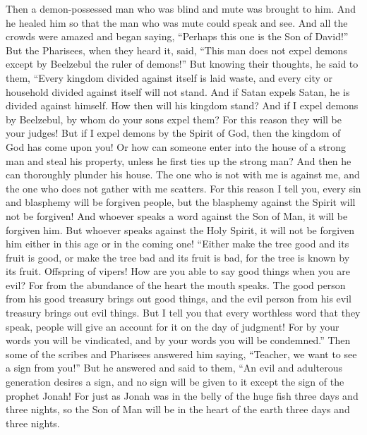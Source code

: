 \begin{biblechapter}
 Then a demon-possessed man who was blind and mute was brought to him. And he healed him so that the man who was mute could speak and see.
\verse And all the crowds were amazed and began saying, “Perhaps this one is the Son of David!”
\verse But the Pharisees, when they heard it, said, “This man does not expel demons except by Beelzebul the ruler of demons!”
\verse But knowing their thoughts, he said to them, “Every kingdom divided against itself is laid waste, and every city or household divided against itself will not stand.
\verse And if Satan expels Satan, he is divided against himself. How then will his kingdom stand?
\verse And if I expel demons by Beelzebul, by whom do your sons expel them? For this reason they will be your judges!
\verse But if I expel demons by the Spirit of God, then the kingdom of God has come upon you!
\verse Or how can someone enter into the house of a strong man and steal his property, unless he first ties up the strong man? And then he can thoroughly plunder his house.
\verse The one who is not with me is against me, and the one who does not gather with me scatters.
\verse For this reason I tell you, every sin and blasphemy will be forgiven people, but the blasphemy against the Spirit will not be forgiven!
\verse And whoever speaks a word against the Son of Man, it will be forgiven him. But whoever speaks against the Holy Spirit, it will not be forgiven him either in this age or in the coming one!
 “Either make the tree good and its fruit is good, or make the tree bad and its fruit is bad, for the tree is known by its fruit.
\verse Offspring of vipers! How are you able to say good things when you are evil? For from the abundance of the heart the mouth speaks.
\verse The good person from his good treasury brings out good things, and the evil person from his evil treasury brings out evil things.
\verse But I tell you that every worthless word that they speak, people will give an account for it on the day of judgment!
\verse For by your words you will be vindicated, and by your words you will be condemned.”
 Then some of the scribes and Pharisees answered him saying, “Teacher, we want to see a sign from you!”
\verse But he answered and said to them, “An evil and adulterous generation desires a sign, and no sign will be given to it except the sign of the prophet Jonah!
\verse For just as Jonah was in the belly of the huge fish three days and three nights, so the Son of Man will be in the heart of the earth three days and three nights.

\end{biblechapter}
